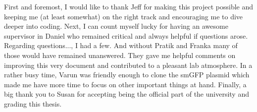 First and foremost, I would like to thank Jeff for making this project possible and keeping me (at least somewhat) on the right track and encouraging me to dive deeper into coding. 
Next, I can count myself lucky for having an awesome supervisor in Daniel who remained critical and always helpful if questions arose. 
Regarding questions..., I had a few.
And without Pratik and Franka many of those would have remained unanswered.
They gave me helpful comments on improving this very document and contributed to a pleasant lab atmosphere.
In a rather busy time, Varun was friendly enough to clone the smGFP plasmid which made me have more time to focus on other important things at hand.
Finally, a big thank you to Susan for accepting being the official part of the university and grading this thesis.
